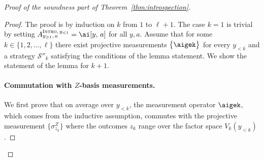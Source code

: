 \documentclass[11pt]{article}
\theoremstyle{definition}
\newcommand{\strategy}{\mathscr{S}}
\newcommand{\typestyle}[1]{\ensuremath{\textsc{#1}}\xspace}
\newcommand{\Intro}{\typestyle{Intro}}
\begin{document}
\begin{proof}[Proof of the soundness part of Theorem~\ref{thm:introspection}]
  \begin{proof}

    The proof is by induction on $k$ from $1$ to $\ell+1$.
    The case $k=1$ is trivial by setting $A_{y_{\geq 1},\, a}^{\Intro,\, y_{<1}}
    = \ai[y,\, a]$ for all $y,a$.
    Assume that for some $k \in \{1, 2, \ldots, \ell\}$ there exist projective
    measurements $\bigl\{\aigek \bigr\}$ for every $y_{< k}$ and a strategy
    $\strategy''_k$ satisfying the conditions of the lemma statement.
    We show the statement of the lemma for $k+1$.

    \paragraph{Commutation with $Z$-basis measurements.}
    We first prove that on average over $y_{< k}$, the measurement operator
    $\aigek$, which comes from the inductive assumption, commutes with the
    projective measurement $\{\sigma^Z_{z_k}\}$ where the outcomes $z_k$ range
    over the factor space $V_k(y_{<k})$.


\end{proof}
\end{proof}
\end{document}
